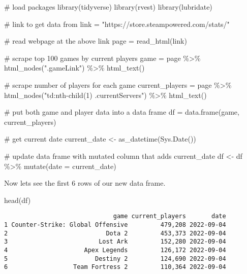 \documentclass[
  letterpaper,
  DIV=11,
  numbers=noendperiod]{scrreprt}
\newenvironment{Shaded}{\begin{snugshade}}{\end{snugshade}}
\newcommand{\AttributeTok}[1]{\textcolor[rgb]{0.40,0.45,0.13}{#1}}
\newcommand{\CommentTok}[1]{\textcolor[rgb]{0.37,0.37,0.37}{#1}}
\newcommand{\FunctionTok}[1]{\textcolor[rgb]{0.28,0.35,0.67}{#1}}
\newcommand{\NormalTok}[1]{\textcolor[rgb]{0.00,0.23,0.31}{#1}}
\newcommand{\OtherTok}[1]{\textcolor[rgb]{0.00,0.23,0.31}{#1}}
\newcommand{\SpecialCharTok}[1]{\textcolor[rgb]{0.37,0.37,0.37}{#1}}
\newcommand{\StringTok}[1]{\textcolor[rgb]{0.13,0.47,0.30}{#1}}
\begin{document}
\begin{Shaded}
\begin{Highlighting}[]
\CommentTok{\# load packages}
\FunctionTok{library}\NormalTok{(tidyverse)}
\FunctionTok{library}\NormalTok{(rvest)}
\FunctionTok{library}\NormalTok{(lubridate)}

\CommentTok{\# link to get data from}
\NormalTok{link }\OtherTok{=} \StringTok{"https://store.steampowered.com/stats/"} 

\CommentTok{\# read webpage at the above link}
\NormalTok{page }\OtherTok{=} \FunctionTok{read\_html}\NormalTok{(link) }

\CommentTok{\# scrape top 100 games by current players}
\NormalTok{game }\OtherTok{=}\NormalTok{ page }\SpecialCharTok{\%\textgreater{}\%} \FunctionTok{html\_nodes}\NormalTok{(}\StringTok{".gameLink"}\NormalTok{) }\SpecialCharTok{\%\textgreater{}\%} \FunctionTok{html\_text}\NormalTok{()  }

\CommentTok{\# scrape number of players for each game }
\NormalTok{current\_players }\OtherTok{=}\NormalTok{ page }\SpecialCharTok{\%\textgreater{}\%} \FunctionTok{html\_nodes}\NormalTok{(}\StringTok{"td:nth{-}child(1) .currentServers"}\NormalTok{) }\SpecialCharTok{\%\textgreater{}\%} \FunctionTok{html\_text}\NormalTok{() }

\CommentTok{\# put both game and player data into a data frame}
\NormalTok{df }\OtherTok{=} \FunctionTok{data.frame}\NormalTok{(game, current\_players) }

\CommentTok{\# get current date}
\NormalTok{current\_date }\OtherTok{\textless{}{-}} \FunctionTok{as\_datetime}\NormalTok{(}\FunctionTok{Sys.Date}\NormalTok{())}

\CommentTok{\# update data frame with mutated column that adds current\_date}
\NormalTok{df }\OtherTok{\textless{}{-}}\NormalTok{ df }\SpecialCharTok{\%\textgreater{}\%} 
  \FunctionTok{mutate}\NormalTok{(}\AttributeTok{date =}\NormalTok{ current\_date)}
\end{Highlighting}
\end{Shaded}

Now lets see the first 6 rows of our new data frame.

\begin{Shaded}
\begin{Highlighting}[]
\FunctionTok{head}\NormalTok{(df)}
\end{Highlighting}
\end{Shaded}

\begin{verbatim}
                              game current_players       date
1 Counter-Strike: Global Offensive         479,208 2022-09-04
2                           Dota 2         453,373 2022-09-04
3                         Lost Ark         152,280 2022-09-04
4                     Apex Legends         126,172 2022-09-04
5                        Destiny 2         124,690 2022-09-04
6                  Team Fortress 2         110,364 2022-09-04
\end{verbatim}
\end{document}
